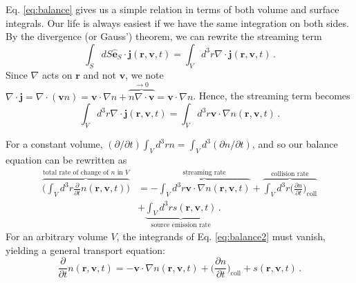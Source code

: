 Eq. \ref{eq:balance} gives us a simple relation in terms of both volume and surface integrals.  Our life is always easiest if we have the same integration on both sides.  By the divergence (or Gauss') theorem, we can rewrite the streaming term
\begin{equation}
 \int_S dS \mathbf{\hat{e}}_S \cdot \mathbf{j}(\mathbf{r},\mathbf{v},t) = \int_V d^3r \nabla \cdot \mathbf{j}(\mathbf{r},\mathbf{v},t) \, .
\end{equation}
Since $\nabla$ acts on $\mathbf{r}$ and not $\mathbf{v}$, we note $ \nabla \cdot \mathbf{j} = \nabla \cdot (\mathbf{v} n) =  \mathbf{v} \cdot \nabla n + \overbrace{ n \nabla \cdot \mathbf{v}}^{\to 0} = \mathbf{v} \cdot \nabla n$.  Hence, the streaming term becomes
\begin{equation}
 \int_V d^3r \nabla \cdot \mathbf{j}(\mathbf{r},\mathbf{v},t) = \int_V d^3r \mathbf{v} \cdot \nabla n(\mathbf{r},\mathbf{v},t) \, .
\end{equation}

For a constant volume, $(\partial/\partial t) \int_V d^3 r n = \int_V d^3 (\partial n/\partial t)$, and so our balance equation can be rewritten as
\begin{equation}
\begin{split}
 \overbrace{  \Bigg ( \int_V d^3 r \frac{\partial}{\partial t}n(\mathbf{r},\mathbf{v},t) \Bigg ) }^{\text{total rate of change of }n\text{ in } V} 
      &=  - \overbrace{\int_V d^3r \mathbf{v} \cdot \nabla n(\mathbf{r},\mathbf{v},t)}^{\text{streaming rate}}
       + \overbrace{ \int_V d^3 r \Big( \frac{\partial n}{\partial t} \Big )_{\mathrm{coll}} }^{\text{collision rate}} \\
      &+ \underbrace{ \int_V d^3 r s(\mathbf{r},\mathbf{v},t) }_{\text{source emission rate}}  \, .
\end{split}
\label{eq:balance2}
\end{equation}
For an arbitrary volume $V$, the integrands of Eq. \ref{eq:balance2} must vanish, yielding a general transport equation:
\begin{equation}
  \frac{\partial}{\partial t}n(\mathbf{r},\mathbf{v},t) = -\mathbf{v} \cdot \nabla n(\mathbf{r},\mathbf{v},t) + \Big( \frac{\partial n}{\partial t} \Big )_{\mathrm{coll}} +  s(\mathbf{r},\mathbf{v},t) \, .
\end{equation}

